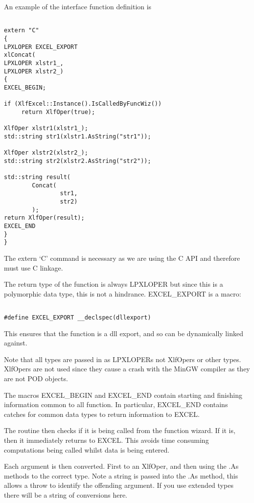 \documentclass[12pt,reqno]{amsart}
\numberwithin{equation}{section}
\numberwithin{figure}{section}
\begin{document}
An example of the interface function definition is 

\begin{verbatim}

extern "C"
{
LPXLOPER EXCEL_EXPORT
xlConcat(
LPXLOPER xlstr1_,
LPXLOPER xlstr2_)
{
EXCEL_BEGIN;

if (XlfExcel::Instance().IsCalledByFuncWiz())
     return XlfOper(true);

XlfOper xlstr1(xlstr1_);
std::string str1(xlstr1.AsString("str1"));

XlfOper xlstr2(xlstr2_);
std::string str2(xlstr2.AsString("str2"));

std::string result(
        Concat(
                str1,
                str2)
        );
return XlfOper(result);
EXCEL_END
}
}

\end{verbatim}

The extern `C' command is necessary as we are using the C API and
therefore must use C linkage. 

The return type of the function is always LPXLOPER but since this is a
polymorphic data type, this is not a hindrance.  EXCEL\_EXPORT is a
macro:
\begin{verbatim}

#define EXCEL_EXPORT __declspec(dllexport)

\end{verbatim}
This ensures that the function is a dll export, and so can be
dynamically linked against. 

Note that all types are passed in as LPXLOPERs not XlfOpers or other
types. XlfOpers are not used since they cause a crash with the MinGW
compiler as they are not POD objects. 

The macros EXCEL\_BEGIN and EXCEL\_END contain starting and finishing
information common to all function. In particular, EXCEL\_END contains
catches for common data types to return information to EXCEL. 

The routine then checks if it is being called from the function
wizard. If it is, then it immediately returns to EXCEL. This avoids
time consuming computations being called whilst data is being
entered. 

Each argument is then converted. First to an XlfOper, and then using
the .As methods to the correct type. Note a string is passed into the
.As method, this allows a throw to identify the offending argument. If
you use extended types there will be a string of conversions here. 
\end{document}
